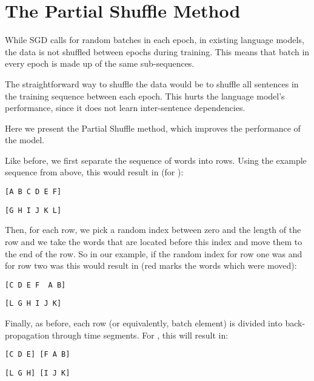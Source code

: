 \documentclass[11pt,a4paper]{article}
\begin{document}
\section{The Partial Shuffle Method}
While SGD calls for random batches in each epoch, in existing language models, the data is not shuffled between epochs during training. This means that batch  in every epoch is made up of the same sub-sequences.

The straightforward way to shuffle the data would be to shuffle all sentences in the training sequence between each epoch. This hurts the language model's performance, since it does not learn inter-sentence dependencies.  

Here we present the Partial Shuffle method, which improves the performance of the model.

Like before, we first separate the sequence of words into  rows. Using the example sequence from above, this would result in (for ):

\texttt{[A B C D E F]}

\texttt{[G H I J K L]}

Then, for each row, we pick a random index between zero and the length of the row and we take the words that are located before this index and move them to the end of the row. So in our example, if the random index for row one was  and for row two was  this would result in (red marks the words which were moved):


\texttt{[C D E F {\color{red} A B}]}

\texttt{[L {\color{red}G H} {\color{red}I J K}]}

Finally, as before, each row (or equivalently, batch element) is divided into back-propagation through time segments. For , this will result in:

\texttt{[C D E] [F A B]}

\texttt{[L G H] [I J K]}
\end{document}
